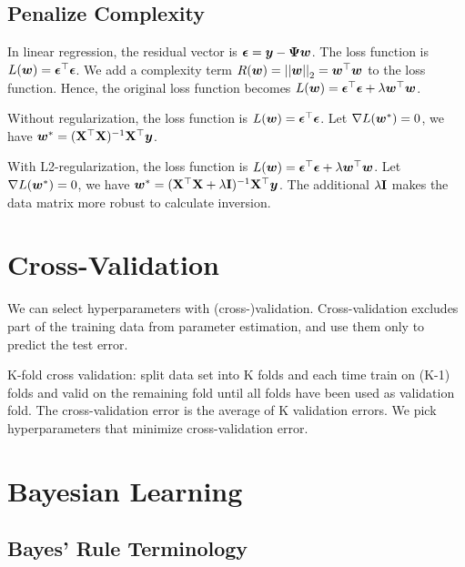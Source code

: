 \subsection{Penalize Complexity}

In linear regression, the residual vector is $\boldsymbol{\epsilon}=\boldsymbol{y}-\boldsymbol{\Psi}\boldsymbol{w}$. The loss function is $L(\boldsymbol{w})=\boldsymbol{\epsilon}{}^\top\boldsymbol{\epsilon}$. We add a complexity term $R(\boldsymbol{w})=\left\vert\left\vert \boldsymbol{w} \right\vert\right\vert_2=\boldsymbol{w}{}^\top\boldsymbol{w}$ to the loss function. Hence, the original loss function becomes $L(\boldsymbol{w})=\boldsymbol{\epsilon}{}^\top\boldsymbol{\epsilon}+\lambda\boldsymbol{w}{}^\top\boldsymbol{w}$.

Without regularization, the loss function is $L(\boldsymbol{w})=\boldsymbol{\epsilon}{}^\top\boldsymbol{\epsilon}$. Let $\nabla L(\boldsymbol{w}^*)=0$, we have $\boldsymbol{w}^*=(\text{\bf X}{}^\top\text{\bf X})^{-1}\text{\bf X}{}^\top\boldsymbol{y}$.

With L2-regularization, the loss function is $L(\boldsymbol{w})=\boldsymbol{\epsilon}{}^\top\boldsymbol{\epsilon}+\lambda\boldsymbol{w}{}^\top\boldsymbol{w}$. Let $\nabla L(\boldsymbol{w}^*)=0$, we have $\boldsymbol{w}^*=(\text{\bf X}{}^\top\text{\bf X}+\lambda\text{\bf I})^{-1}\text{\bf X}{}^\top\boldsymbol{y}$. The additional $\lambda\text{\bf I}$ makes the data matrix more robust to calculate inversion.

\section{Cross-Validation}

We can select hyperparameters with (cross-)validation. Cross-validation excludes part of the training data from parameter estimation, and use them only to predict the test error.

K-fold cross validation: split data set into K folds and each time train on (K-1) folds and valid on the remaining fold until all folds have been used as validation fold. The cross-validation error is the average of K validation errors. We pick hyperparameters that minimize cross-validation error.

\section{Bayesian Learning}

\subsection{Bayes' Rule Terminology}

